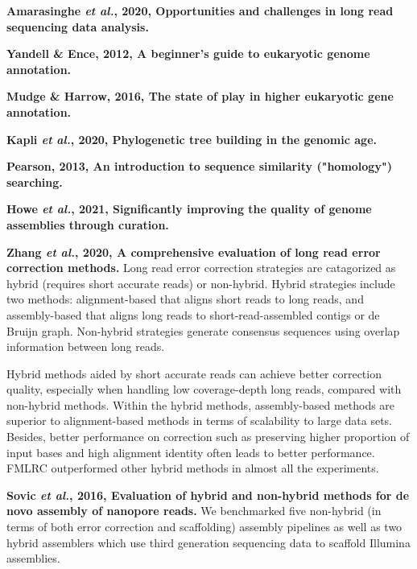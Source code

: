 \documentclass[11pt]{article}
\begin{document}
\begin{sloppypar}
\par
\textbf{Amarasinghe \textit{et al.}, 2020, Opportunities and challenges in long read sequencing data analysis.} \newline
\par
\textbf{Yandell & Ence, 2012, A beginner's guide to eukaryotic genome annotation.} \newline
\par
\textbf{Mudge & Harrow, 2016, The state of play in higher eukaryotic gene annotation.} \newline
\par
\textbf{Kapli \textit{et al.}, 2020, Phylogenetic tree building in the genomic age.} \newline
\par
\textbf{Pearson, 2013, An introduction to sequence similarity ("homology") searching.} \newline
\par
\textbf{Howe \textit{et al.}, 2021, Significantly improving the quality of genome assemblies through curation.} \newline
\par
\textbf{Zhang \textit{et al.}, 2020, A comprehensive evaluation of long read error correction methods.} \newline
Long read error correction strategies are catagorized as hybrid (requires short accurate reads) or non-hybrid. 
Hybrid strategies include two methods: alignment-based that aligns short reads to long reads, and assembly-based that aligns long reads to short-read-assembled contigs or de Bruijn graph. 
Non-hybrid strategies generate consensus sequences using overlap information between long reads. 
\par
Hybrid methods aided by short accurate reads can achieve better correction quality, especially when handling low coverage-depth long reads, compared with non-hybrid methods. 
Within the hybrid methods, assembly-based methods are superior to alignment-based methods in terms of scalability to large data sets. 
Besides, better performance on correction such as preserving higher proportion of input bases and high alignment identity often leads to better performance. 
FMLRC outperformed other hybrid methods in almost all the experiments.
\par
\textbf{Sovic \textit{et al.}, 2016, Evaluation of hybrid and non-hybrid methods for de novo assembly of nanopore reads.} \newline
We benchmarked five non-hybrid (in terms of both error correction and scaffolding) assembly pipelines as well as two hybrid assemblers which use third generation sequencing data to scaffold Illumina assemblies. 

\end{sloppypar}
\end{document}

